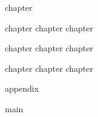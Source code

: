 \documentclass[a4paper,10pt,twoside]{MFHbook}
\begin{document}








\cleardoublepage
{}
     {chapter}

        {chapter}
   {chapter}
     {chapter}

{chapter}
{chapter}
  {chapter}

  {chapter}
{chapter}
   {chapter}

 {appendix}


{main}


\end{document}
